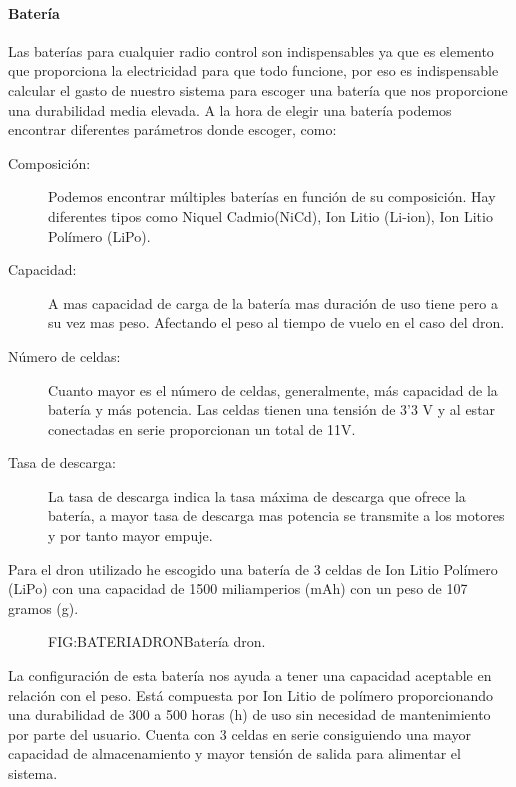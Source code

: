 	

\paragraph{Batería}
\label{SSS:Bateria}

 Las baterías para cualquier radio control son indispensables ya que es elemento que proporciona la electricidad para que todo funcione, por eso es indispensable calcular el gasto de nuestro sistema para escoger una batería que nos proporcione una durabilidad media elevada.
 A la hora de elegir una batería podemos encontrar diferentes parámetros donde escoger, como:
 
 \begin{description}
 \item[Composición: ] Podemos encontrar múltiples baterías en función de su composición. Hay diferentes tipos como Niquel Cadmio(NiCd), Ion Litio (Li‑ion), Ion Litio Polímero (LiPo).
 \item[Capacidad: ] A mas capacidad de carga de la batería mas duración de uso tiene pero a su vez mas peso. Afectando el peso al tiempo de vuelo en el caso del dron.
 \item[Número de celdas: ] Cuanto mayor es el número de celdas, generalmente, más capacidad de la batería y más potencia. Las celdas tienen una tensión de 3'3 V y al estar conectadas en serie proporcionan un total de 11V.
 \item[Tasa de descarga: ] La tasa de descarga indica la tasa máxima de descarga que ofrece la batería, a mayor tasa de descarga mas potencia se transmite a los motores y por tanto mayor empuje. 
 \end{description}

Para el dron utilizado he escogido una batería de 3 celdas de Ion Litio Polímero (LiPo) con una capacidad de 1500 miliamperios (mAh) con un peso de 107 gramos (g). 

	\begin{figure}[Batería dron]{FIG:BATERIADRON}{Batería dron.}
\end{figure}

La configuración de esta batería nos ayuda a tener una capacidad aceptable en relación con el peso. 
Está compuesta por Ion Litio de polímero proporcionando una durabilidad de 300 a 500 horas (h) de uso sin necesidad de mantenimiento por parte del usuario. 
Cuenta con 3 celdas en serie consiguiendo una mayor capacidad de almacenamiento y mayor tensión de salida para alimentar el sistema.


	
